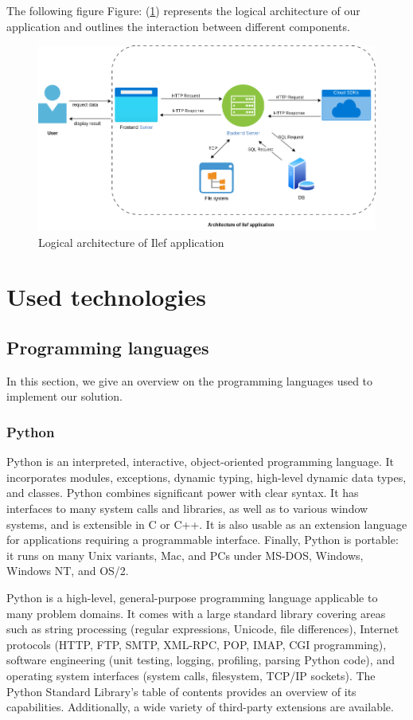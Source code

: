 The following figure {Figure: (\ref{fig:archi-log})} represents the logical architecture of our application and outlines the interaction between different components.
\vspace*{3cm}

\begin{figure}[h]
  \center
  \includegraphics[width=15cm]{./chapters/preliminary_study/archi-logique.png}
  \caption{Logical architecture of Ilef application}
  \label{fig:archi-log}
\end{figure}

\section{Used technologies}

\subsection{Programming languages}
In this section, we give an overview on the programming languages used to implement our solution.
\subsubsection{Python}
Python is an interpreted, interactive, object-oriented programming language. It incorporates modules, exceptions, dynamic typing, high-level dynamic data types, and classes. Python combines significant power with clear syntax. It has interfaces to many system calls and libraries, as well as to various window systems, and is extensible in C or C++. It is also usable as an extension language for applications requiring a programmable interface. Finally, Python is portable: it runs on many Unix variants, Mac, and PCs under MS-DOS, Windows, Windows NT, and OS/2.

Python is a high-level, general-purpose programming language applicable to many problem domains. It comes with a large standard library covering areas such as string processing (regular expressions, Unicode, file differences), Internet protocols (HTTP, FTP, SMTP, XML-RPC, POP, IMAP, CGI programming), software engineering (unit testing, logging, profiling, parsing Python code), and operating system interfaces (system calls, filesystem, TCP/IP sockets). The Python Standard Library's table of contents provides an overview of its capabilities. Additionally, a wide variety of third-party extensions are available.\cite{python}

